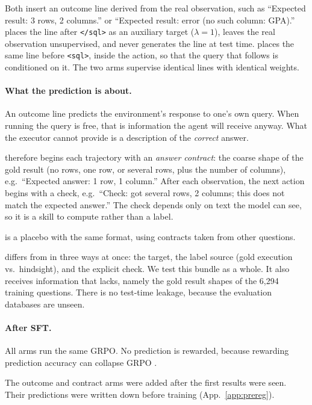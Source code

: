 Both insert an outcome line derived from the real observation, such as ``Expected result: 3 rows, 2 columns.'' or ``Expected result: error (no such column: GPA).'' \armE{} places the line after \texttt{</sql>} as an auxiliary target ($\lambda=1$), leaves the real observation unsupervised, and never generates the line at test time. \armF{} places the same line before \texttt{<sql>}, inside the action, so that the query that follows is conditioned on it. The two arms supervise identical lines with identical weights.

\paragraph{What the prediction is about.}
An outcome line predicts the environment's response to one's own query. When running the query is free, that is information the agent will receive anyway. What the executor cannot provide is a description of the \emph{correct} answer.

\armG{} therefore begins each trajectory with an \emph{answer contract}: the coarse shape of the gold result (no rows, one row, or several rows, plus the number of columns), e.g.\ ``Expected answer: 1 row, 1 column.'' After each observation, the next action begins with a check, e.g.\ ``Check: got several rows, 2 columns; this does not match the expected answer.'' The check depends only on text the model can see, so it is a skill to compute rather than a label.

\armGp{} is a placebo with the same format, using contracts taken from other questions.

\armG{} differs from \armF{} in three ways at once: the target, the label source (gold execution vs.\ hindsight), and the explicit check. We test this bundle as a whole. It also receives information that \armA{} lacks, namely the gold result shapes of the 6,294 training questions. There is no test-time leakage, because the evaluation databases are unseen.

\paragraph{After SFT.}
All arms run the same GRPO. No prediction is rewarded, because rewarding prediction accuracy can collapse GRPO \citep{wang2026darkroom}.

The outcome and contract arms were added after the first results were seen. Their predictions were written down before training (App.~\ref{app:prereg}).
